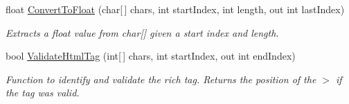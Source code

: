 \begin{DoxyCompactItemize}
float \mbox{\hyperlink{class_t_m_pro_1_1_t_m_p___text_aceafbcdcf06016920f9288d01c93fb36}{Convert\+To\+Float}} (char\mbox{[}$\,$\mbox{]} chars, int start\+Index, int length, out int last\+Index)
\begin{DoxyCompactList}\small\item\em Extracts a float value from char\mbox{[}\mbox{]} given a start index and length. \end{DoxyCompactList}\item 
bool \mbox{\hyperlink{class_t_m_pro_1_1_t_m_p___text_af7ff73dda0d61579b4a59f1449d8bdcb}{Validate\+Html\+Tag}} (int\mbox{[}$\,$\mbox{]} chars, int start\+Index, out int end\+Index)
\begin{DoxyCompactList}\small\item\em Function to identify and validate the rich tag. Returns the position of the $>$ if the tag was valid. \end{DoxyCompactList}\end{DoxyCompactItemize}
